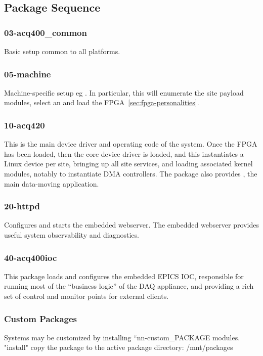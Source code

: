 \documentclass[]{article}
\begin{document}
\subsection{Package Sequence}


\subsubsection{03-acq400_common}
Basic setup common to all platforms.

\subsubsection{05-machine}
Machine-specific setup eg .
In particular, this will enumerate the site payload modules, select an  and load the FPGA~\ref{sec:fpga-personalities}.

\subsubsection{10-acq420}
This is the main device driver and operating code of the  system.
Once the FPGA has been loaded, then the core device driver  is loaded, and this instantiates a Linux device per site, bringing up all site services, and loading associated kernel modules, notably to instantiate DMA controllers. The package also provides , the main data-moving application.

\subsubsection{20-httpd}
Configures and starts the embedded webserver. The embedded webserver provides useful system observability and diagnostics.

\subsubsection{40-acq400ioc}
This package loads and configures the embedded EPICS IOC, responsible for running most of the “business logic” of the DAQ appliance, and providing a rich set of control and monitor points for external clients.

\subsubsection{Custom Packages}
Systems may be customized by installing “nn-custom_PACKAGE modules.
"install" copy the package to the active package directory: /mnt/packages
\end{document}
